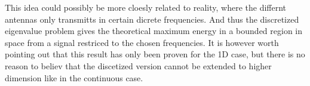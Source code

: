 \documentclass[11pt,a4paper, 
swedish,english %
]{article}
\begin{document}
This idea could possibly be more cloesly related to reality, where the
differnt antennas only transmitts in certain dicrete frequencies. And
thus the discretized eigenvalue problem gives the theoretical maximum
energy in a bounded region in space from a signal restriced to the
chosen frequencies. 
It is however worth pointing out that this result has only been proven
for the 1D case\cite{PSWF-V_1978}, but there is no reason to believ
that the discetized version cannot be extended to higher dimension
like in the continuous case. 










\clearpage %
\appendix  %


\end{document}
